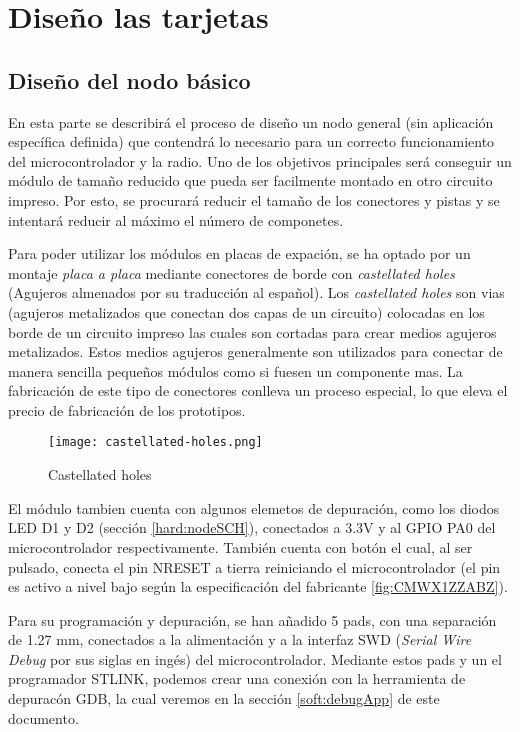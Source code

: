 \section{Diseño las tarjetas}

	\subsection{Diseño del nodo básico} 
	
		En esta parte se describirá el proceso de diseño un nodo general (sin aplicación específica definida) que contendrá lo necesario para un correcto funcionamiento del microcontrolador y la radio. Uno de los objetivos principales será conseguir un módulo de tamaño reducido que pueda ser facilmente montado en otro circuito impreso. Por esto, se procurará reducir el tamaño de los conectores y pistas y se intentará reducir al máximo el número de componetes.
		
		Para poder utilizar los módulos en placas de expación, se ha optado por un montaje \textit{placa a placa} mediante conectores de borde con \textit{castellated holes} (Agujeros almenados por su traducción al español). Los \textit{castellated holes} son vias (agujeros metalizados que conectan dos capas de un circuito) colocadas en los borde de un circuito impreso las cuales son cortadas para crear medios agujeros metalizados. Estos medios agujeros generalmente son utilizados para conectar de manera sencilla pequeños módulos como si fuesen un componente mas. La fabricación de este tipo de conectores conlleva un proceso especial, lo que eleva el precio de fabricación de los prototipos.

	\begin{figure}[htb!]
		\centering
		\texttt{[image: castellated-holes.png]}
		\caption{Castellated holes}
		\label{fig:castellated}
	\end{figure}
El módulo tambien cuenta con algunos elemetos de depuración, como los diodos LED D1 y D2 (sección \ref{hard:nodeSCH}), conectados a 3.3V y al GPIO PA0 del microcontrolador respectivamente. También cuenta con botón el cual, al ser pulsado, conecta el pin NRESET a tierra reiniciando el microcontrolador (el pin es activo a nivel bajo según la especificación del fabricante \ref{fig:CMWX1ZZABZ}).

Para su programación y depuración, se han añadido 5 pads, con una separación de 1.27 mm, conectados a la alimentación y a la interfaz SWD (\textit{Serial Wire Debug} por sus siglas en ingés) del microcontrolador. Mediante estos pads y un el programador STLINK, podemos crear una conexión con la herramienta de depuracón GDB, la cual veremos en la sección \ref{soft:debugApp} de este documento.

